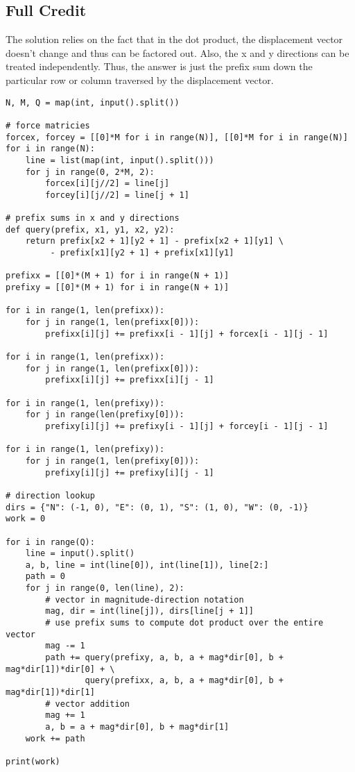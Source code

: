 \documentclass[11pt, oneside]{article}
\begin{document}
\newpage

\subsection{Full Credit}

The solution relies on the fact that in the dot product, the displacement vector
doesn't change and thus can be factored out. Also, the x and y directions
can be treated independently. Thus, the answer is just the prefix sum down
the particular row or column traversed by the displacement vector.

\begin{verbatim}
N, M, Q = map(int, input().split())

# force matricies
forcex, forcey = [[0]*M for i in range(N)], [[0]*M for i in range(N)]
for i in range(N):
    line = list(map(int, input().split()))
    for j in range(0, 2*M, 2):
        forcex[i][j//2] = line[j]
        forcey[i][j//2] = line[j + 1]

# prefix sums in x and y directions
def query(prefix, x1, y1, x2, y2):
    return prefix[x2 + 1][y2 + 1] - prefix[x2 + 1][y1] \
         - prefix[x1][y2 + 1] + prefix[x1][y1]

prefixx = [[0]*(M + 1) for i in range(N + 1)]
prefixy = [[0]*(M + 1) for i in range(N + 1)]

for i in range(1, len(prefixx)):
    for j in range(1, len(prefixx[0])):
        prefixx[i][j] += prefixx[i - 1][j] + forcex[i - 1][j - 1]

for i in range(1, len(prefixx)):
    for j in range(1, len(prefixx[0])):
        prefixx[i][j] += prefixx[i][j - 1]

for i in range(1, len(prefixy)):
    for j in range(len(prefixy[0])):
        prefixy[i][j] += prefixy[i - 1][j] + forcey[i - 1][j - 1]

for i in range(1, len(prefixy)):
    for j in range(1, len(prefixy[0])):
        prefixy[i][j] += prefixy[i][j - 1]

# direction lookup
dirs = {"N": (-1, 0), "E": (0, 1), "S": (1, 0), "W": (0, -1)}
work = 0

for i in range(Q):
    line = input().split()
    a, b, line = int(line[0]), int(line[1]), line[2:]
    path = 0
    for j in range(0, len(line), 2):
        # vector in magnitude-direction notation
        mag, dir = int(line[j]), dirs[line[j + 1]]
        # use prefix sums to compute dot product over the entire vector
        mag -= 1
        path += query(prefixy, a, b, a + mag*dir[0], b + mag*dir[1])*dir[0] + \
                query(prefixx, a, b, a + mag*dir[0], b + mag*dir[1])*dir[1]
        # vector addition
        mag += 1
        a, b = a + mag*dir[0], b + mag*dir[1]
    work += path

print(work)
\end{verbatim}
\end{document}
